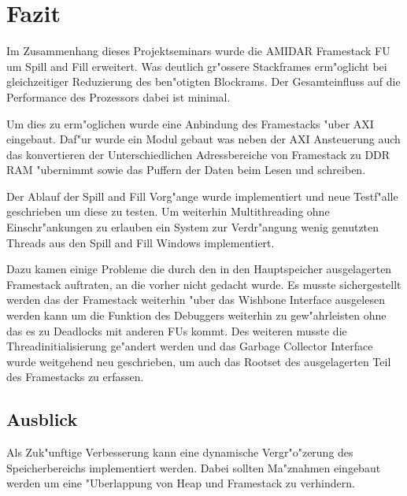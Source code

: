 \chapter{Fazit}
\label{cha:Fazit}

Im Zusammenhang dieses Projektseminars wurde die AMIDAR Framestack FU um Spill and Fill erweitert. Was deutlich gr"o{ss}ere Stackframes erm"oglicht bei gleichzeitiger Reduzierung des ben"otigten Blockrams. Der Gesamteinfluss auf die Performance des Prozessors dabei ist minimal. 

Um dies zu erm"oglichen wurde eine Anbindung des Framestacks "uber AXI eingebaut. Daf"ur wurde ein Modul gebaut was neben der AXI Ansteuerung auch das konvertieren der Unterschiedlichen Adressbereiche von Framestack zu DDR RAM "ubernimmt sowie das Puffern der Daten beim Lesen und schreiben.  

Der Ablauf der Spill and Fill Vorg"ange wurde implementiert und neue Testf"alle geschrieben um diese zu testen. 
Um weiterhin Multithreading ohne Einschr"ankungen zu erlauben ein System zur Verdr"angung wenig genutzten Threads aus den Spill and Fill Windows implementiert. 

Dazu kamen einige Probleme die durch den in den Hauptspeicher ausgelagerten Framestack auftraten, an die vorher nicht gedacht wurde. 
Es musste sichergestellt werden das der Framestack weiterhin "uber das Wishbone Interface ausgelesen werden kann um die Funktion des Debuggers weiterhin zu gew"ahrleisten ohne das es zu Deadlocks mit anderen FUs kommt. Des weiteren musste die Threadinitialisierung ge"andert werden und das Garbage Collector Interface wurde weitgehend neu geschrieben, um auch das Rootset des ausgelagerten Teil des Framestacks zu erfassen.  

\section{Ausblick}

Als Zuk"unftige Verbesserung kann eine dynamische Vergr"o"zerung des Speicherbereichs implementiert werden. Dabei sollten Ma"znahmen eingebaut werden um eine "Uberlappung von Heap und Framestack zu verhindern.